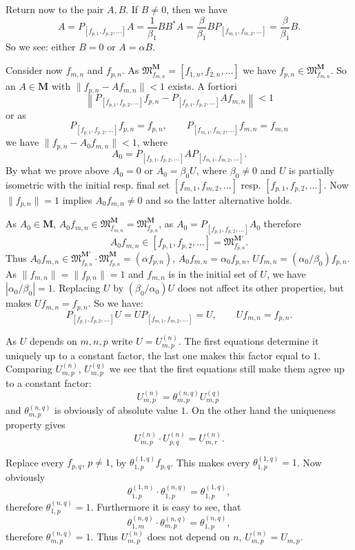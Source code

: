 \documentclass[12pt,b5paper,twoside]{article}
\newcommand{\M}{\mathbf M}
\begin{document}
Return now to the pair $A,B$. If $B\neq0$, then we have
\[
 A=P_{[f_{p,1},f_{p,2},\ldots]}A
 =\frac1{\beta_1}BB^*A
 =\frac\beta{\beta_1}BP_{[f_{m,1},f_{m,2},\ldots]}
 =\frac\beta{\beta_1}B.
\]
So we see: either $B=0$ or $A=\alpha B$.

Consider now $f_{m,n}$ and $f_{p,n}$. As
$\mathfrak M_{f_{m,n}}^{\M}=[f_{1,n},f_{2,n},\ldots]$ we have
$f_{p,n}\in\mathfrak M_{f_{m,n}}^{\M}$. So an $A\in\M$ with
$\lVert f_{p,n}-Af_{m,n}\rVert<1$ exists. A fortiori
\[
 \left\lVert
 P_{[f_{p,1},f_{p,2},\ldots]}f_{p,n}
 -P_{[f_{p,1},f_{p,2},\ldots]}Af_{m,n}
 \right\rVert<1
\]
or as
\[
 P_{[f_{p,1},f_{p,2},\ldots]}f_{p,n}=f_{p,n},
 \qquad
 P_{[f_{m,1},f_{m,2},\ldots]}f_{m,n}=f_{m,n}
\]
we have $\lVert f_{p,n}-A_0f_{m,n}\rVert<1$, where
\[
 A_0=P_{[f_{p,1},f_{p,2},\ldots]}A
 P_{[f_{m,1},f_{m,2},\ldots]}.
\]
By what we prove above $A_0=0$ or $A_0=\beta_0U$, where $\beta_0\neq0$ and
$U$ is partially isometric with the initial resp. final set
$[f_{m,1},f_{m,2},\ldots]$ resp. $[f_{p,1},f_{p,2},\ldots]$. Now
$\lVert f_{p,n}\rVert=1$ implies $A_0f_{m,n}\neq0$ and so the latter
alternative holds.

As $A_0\in\M$,
$A_0f_{m,n}\in\mathfrak M_{f_{m,n}}^{\M}
=\mathfrak M_{f_{p,n}}^{\M}$, as
$A_0=P_{[f_{p,1},f_{p,2},\ldots]}A_0$ therefore
\[
 A_0f_{m,n}\in[f_{p,1},f_{p,2},\ldots]
 =\mathfrak M_{f_{p,n}}^{\M'}.
\]
Thus
$A_0f_{m,n}\in\mathfrak M_{f_{p,n}}^{\M'}\cdot
\mathfrak M_{f_{p,n}}^{\M}=(\alpha f_{p,n})$,
$A_0f_{m,n}=\alpha_0f_{p,n}$,
$Uf_{m,n}=(\alpha_0/\beta_0)f_{p,n}$. As
$\lVert f_{m,n}\rVert=\lVert f_{p,n}\rVert=1$ and $f_{m,n}$ is in the
initial set of $U$, we have $|\alpha_0/\beta_0|=1$. Replacing $U$ by
$(\beta_0/\alpha_0)U$ does not affect its other properties, but makes
$Uf_{m,n}=f_{p,n}$. So we have:
\[
 P_{[f_{p,1},f_{p,2},\ldots]}U
 =UP_{[f_{m,1},f_{m,2},\ldots]}=U,
 \qquad Uf_{m,n}=f_{p,n}.
\]

As $U$ depends on $m,n,p$ write $U=U_{m,p}^{(n)}$. The first equations
determine it uniquely up to a constant factor, the last one makes this factor
equal to $1$. Comparing $U_{m,p}^{(n)}$, $U_{m,p}^{(q)}$ we see that the first
equations still make them agree up to a constant factor:
\[
 U_{m,p}^{(n)}=\theta_{m,p}^{(n,q)}U_{m,p}^{(q)}
\]
and $\theta_{m,p}^{(n,q)}$ is obviously of absolute value $1$. On the other
hand the uniqueness property gives
\[
 U_{m,p}^{(n)}\cdot U_{p,q}^{(n)}=U_{m,r}^{(n)}.
\]

Replace every $f_{p,q}$, $p\neq1$, by
$\theta_{1,p}^{(1,q)}f_{p,q}$. This makes every
$\theta_{1,p}^{(1,q)}=1$. Now obviously
\[
 \theta_{1,p}^{(1,n)}\cdot\theta_{1,p}^{(n,q)}
 =\theta_{1,p}^{(1,q)},
\]
therefore $\theta_{1,p}^{(n,q)}=1$. Furthermore it is easy to see, that
\[
 \theta_{1,m}^{(n,q)}\cdot\theta_{m,p}^{(n,q)}
 =\theta_{1,p}^{(n,q)},
\]
therefore $\theta_{m,p}^{(n,q)}=1$. Thus $U_{m,p}^{(n)}$ does not depend on
$n$, $U_{m,p}^{(n)}=U_{m,p}$.
\end{document}
